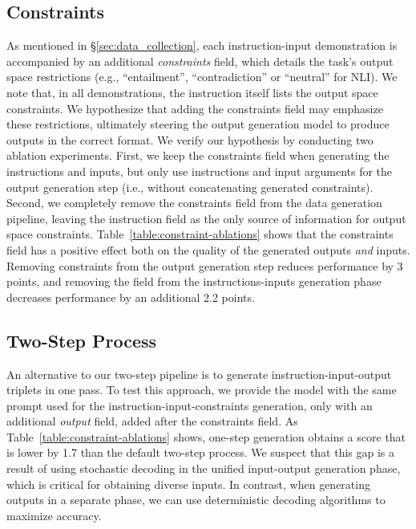 \subsection{Constraints}

As mentioned in \S\ref{sec:data_collection}, each instruction-input demonstration is accompanied by an additional \textit{constraints} field, which details the task's output space restrictions (e.g., ``entailment'', ``contradiction'' or ``neutral'' for NLI). We note that, in all demonstrations, the instruction itself lists the output space constraints. We hypothesize that adding the constraints field may emphasize these restrictions, ultimately steering the output generation model to produce outputs in the correct format. We verify our hypothesis by conducting two ablation experiments. First, we keep the constraints field when generating the instructions and inputs, but only use instructions and input arguments for the output generation step (i.e., without concatenating generated constraints). Second, we completely remove the constraints field from the data generation pipeline, leaving the instruction field as the only source of information for output space constraints.
Table~\ref{table:constraint-ablations} shows that the constraints field has a positive effect both on the quality of the generated outputs \textit{and} inputs. Removing constraints from the output generation step reduces performance by 3 points, and removing the field from the instructions-inputs generation phase decreases performance by an additional 2.2 points.

\subsection{Two-Step Process}

An alternative to our two-step pipeline is to generate instruction-input-output triplets in one pass. To test this approach, we provide the model with the same prompt used for the instruction-input-constraints generation, only with an additional \textit{output} field, added after the constraints field. As Table~\ref{table:constraint-ablations} shows, one-step generation obtains a score that is lower by 1.7 than the default two-step process. We suspect that this gap is a result of using stochastic decoding in the unified input-output generation phase, which is critical for obtaining diverse inputs. In contrast, when generating outputs in a separate phase, we can use deterministic decoding algorithms to maximize accuracy.

